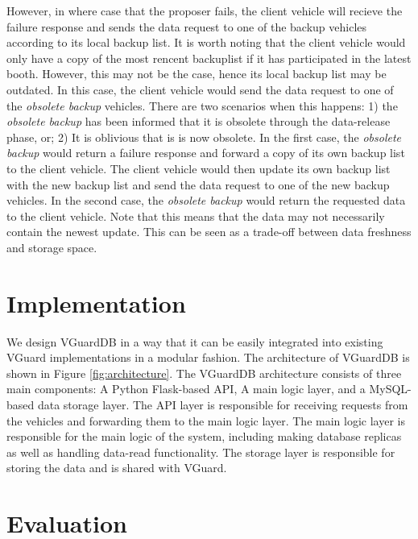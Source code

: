 However, in where case that the proposer fails, the client vehicle will recieve the failure response and sends the data request to one of the backup vehicles according to its local backup list. It is worth noting that the client vehicle would only have a copy of the most rencent backuplist if it has participated in the latest booth. However, this may not be the case, hence its local backup list may be outdated. In this case, the client vehicle would send the data request to one of the \textit{obsolete backup} vehicles. There are two scenarios when this happens: 1) the \textit{obsolete backup} has been informed that it is obsolete through the data-release phase, or; 2) It is oblivious that is is now obsolete. In the first case, the \textit{obsolete backup} would return a failure response and forward a copy of its own backup list to the client vehicle. The client vehicle would then update its own backup list with the new backup list and send the data request to one of the new backup vehicles. In the second case, the \textit{obsolete backup} would return the requested data to the client vehicle. Note that this means that the data may not necessarily contain the newest update. This can be seen as a trade-off between data freshness and storage space.

\section{Implementation}
We design VGuardDB in a way that it can be easily integrated into existing VGuard implementations in a modular fashion. The architecture of VGuardDB is shown in Figure \ref{fig:architecture}. The VGuardDB architecture consists of three main components: A Python Flask-based API, A main logic layer, and a MySQL-based data storage layer. The API layer is responsible for receiving requests from the vehicles and forwarding them to the main logic layer. The main logic layer is responsible for the main logic of the system, including making database replicas as well as handling data-read functionality. The storage layer is responsible for storing the data and is shared with VGuard.


\section{Evaluation}


